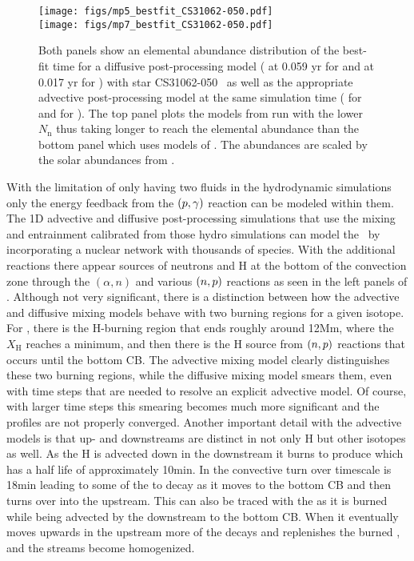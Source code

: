\documentclass[fleqn,usenatbib]{mnras}
\begin{document}
\begin{figure}

  \texttt{[image: figs/mp5\_bestfit\_CS31062-050.pdf]}\\
  \texttt{[image: figs/mp7\_bestfit\_CS31062-050.pdf]}
  \centering
  \caption{Both panels show an elemental abundance distribution of the best-fit
          time for a diffusive post-processing model ( at 0.059 yr for  and
           at 0.017 yr for ) with star CS31062-050~\citep{aoki:02c, johnson:04} as
          well as the appropriate advective post-processing model at the same simulation
          time ( for  and  for ). The top panel
          plots the models from run  with the lower $N_{\mathrm{n}}$ thus taking
          longer to reach the  elemental abundance than the bottom panel
          which uses models of . The abundances are scaled by the solar
          abundances from \citet{Asplund2009}.}
  \label{fig:abu-distri}
\end{figure}

With the limitation of only having two fluids in the hydrodynamic simulations
only the energy feedback from the $(p,\gamma)$
reaction can be modeled within them. The 1D advective and diffusive
post-processing simulations that use the mixing and entrainment calibrated from
those hydro simulations can model the \ipr~by incorporating a nuclear network with
thousands of species. With the additional reactions there appear
sources of neutrons and H at the bottom of the convection zone through the
$(\alpha,n)$ and various $(n, p)$ reactions as
seen in the left panels of . Although not very significant, there is a
distinction between how the advective and diffusive mixing models behave with
two burning regions for a given isotope. For , there is the H-burning
region that ends roughly around \unit{12}{Mm}, where the $X_{\mathrm{H}}$
reaches a minimum, and then there is the H source from $(n, p)$ reactions
that occurs until the bottom CB. The advective mixing model clearly
distinguishes these two burning regions, while the diffusive mixing model smears
them, even with time steps that are needed to resolve an explicit
advective model. Of course, with larger time steps this smearing becomes much
more significant and the profiles are not properly converged. Another important
detail with the advective models is that up- and downstreams are distinct in
not only H but other isotopes as well. As the H is advected down in the
downstream it burns to produce  which has a half life of
approximately \unit{10}{min}. In  the convective turn over timescale
is \unit{18}{min} leading to some of the  to decay as it moves to
the bottom CB and then turns over into the upstream. This can also be traced
with the  as it is burned while being advected by the downstream to
the bottom CB. When it eventually moves upwards in the upstream more of the
 decays and replenishes the burned , and the streams
become homogenized.
\end{document}
